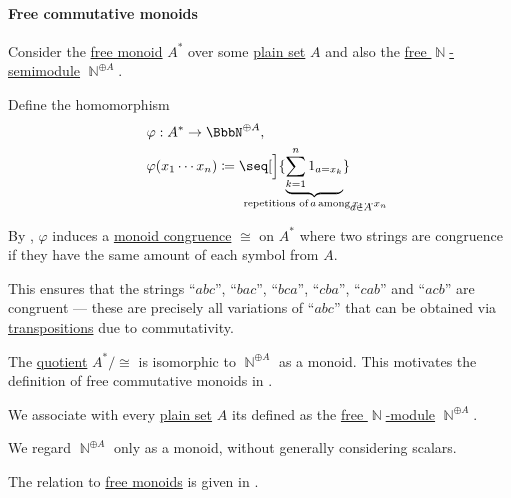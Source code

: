 \paragraph{Free commutative monoids}

\begin{remark}\label{rem:free_commutative_monoid_as_quotient}
  Consider the \hyperref[def:free_monoid]{free monoid} \( A^* \) over some \hyperref[def:set]{plain set} \( A \) and also the \hyperref[def:free_semimodule]{free \( \BbbN \)-semimodule} \( \BbbN^{\oplus A} \).

  Define the homomorphism
  \begin{equation*}
    \begin{aligned}
      &\varphi: A^* \to \BbbN^{\oplus A}, \\
      &\varphi(x_1 \cdots x_n) \coloneqq \seq[\Big]{ \underbrace{\sum_{k=1}^n 1_{a = x_k}}_{\mathclap{\T*{repetitions of} a \T*{among} x_1 \cdots x_n} }}_{a \in A}
    \end{aligned}
  \end{equation*}

  By , \( \varphi \) induces a \hyperref[def:first_order_congruence]{monoid congruence} \( \cong \) on \( A^* \) where two strings are congruence if they have the same amount of each symbol from \( A \).

  This ensures that the strings \enquote{\( abc \)}, \enquote{\( bac \)}, \enquote{\( bca \)}, \enquote{\( cba \)}, \enquote{\( cab \)} and \enquote{\( acb \)} are congruent --- these are precisely all variations of \enquote{\( abc \)} that can be obtained via \hyperref[def:transposition]{transpositions} due to commutativity.

  The \hyperref[def:first_order_quotient]{quotient} \( A^* / \cong \) is isomorphic to \( \BbbN^{\oplus A} \) as a monoid. This motivates the definition of free commutative monoids in .
\end{remark}

\begin{definition}\label{def:free_commutative_monoid}\mimprovised
  We associate with every \hyperref[def:set]{plain set} \( A \) its  defined as the \hyperref[def:free_semimodule]{free \( \BbbN \)-module} \( \BbbN^{\oplus A} \).
\end{definition}
\begin{comments}
  \item We regard \( \BbbN^{\oplus A} \) only as a monoid, without generally considering scalars.
  \item The relation to \hyperref[def:free_monoid]{free monoids} is given in .
\end{comments}

